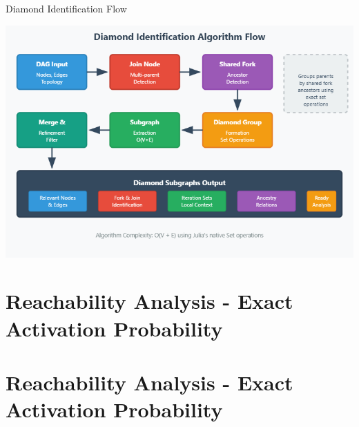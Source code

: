 \documentclass[aspectratio=169]{beamer}
\begin{document}
\begin{frame}{\textcolor{juliared}{Diamond Identification Flow}}
\begin{center}
\includegraphics[height=0.9\textheight]{diamond_identification_flow.png}
\end{center}
\end{frame}

\section{Reachability Analysis - Exact Activation Probability}

\section{Reachability Analysis - Exact Activation Probability}
\end{document}
